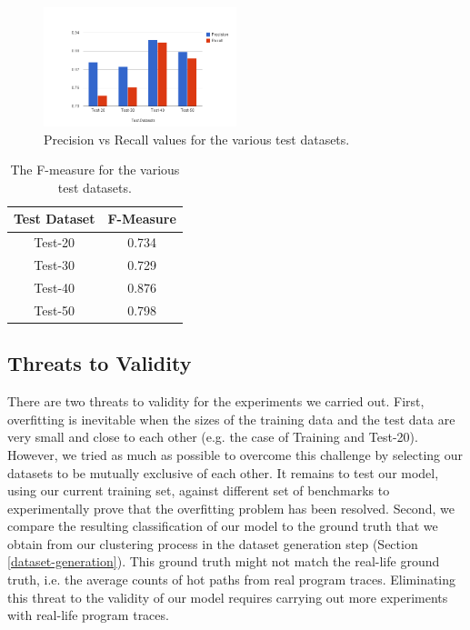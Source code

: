 \documentclass[10pt,twocolumn,letterpaper]{article}
\begin{document}
\begin{figure}[h!]
\centering
\includegraphics[width=0.5\textwidth]{imgs/precision-recall.png}
\caption{Precision vs Recall values for the various test datasets.}
\label{fig:precision-recall}
\end{figure}

\begin{table}[h!]
\centering
\begin{tabular}{|c|c|}
\hline
\textbf{Test Dataset} & \textbf{F-Measure}\\
\hline\hline
Test-20 & 0.734 \\
\hline
Test-30 & 0.729 \\
\hline
Test-40 & 0.876 \\
\hline
Test-50 & 0.798 \\
\hline
\end{tabular}
\centering
\caption{The F-measure for the various test datasets.}
\label{tab:fmeasure}
\end{table}

\subsection{Threats to Validity}
There are two threats to validity for the experiments we carried out. First, overfitting is inevitable when the sizes of the training data and the test data
are very small and close to each other (e.g. the case of Training and Test-20). However, we tried as much as possible to overcome this challenge by selecting
our datasets to be mutually exclusive of each other. It remains to test our model, using our current training set, against different set of benchmarks to
experimentally prove that the overfitting problem has been resolved. Second, we compare the resulting classification of our model to the ground truth that we
obtain from our clustering process in the dataset generation step (Section \ref{dataset-generation}). This ground truth might not match the real-life ground
truth, i.e. the average counts of hot paths from real program traces. Eliminating this threat to the validity of our model requires carrying out more
experiments with real-life program traces.
\end{document}
